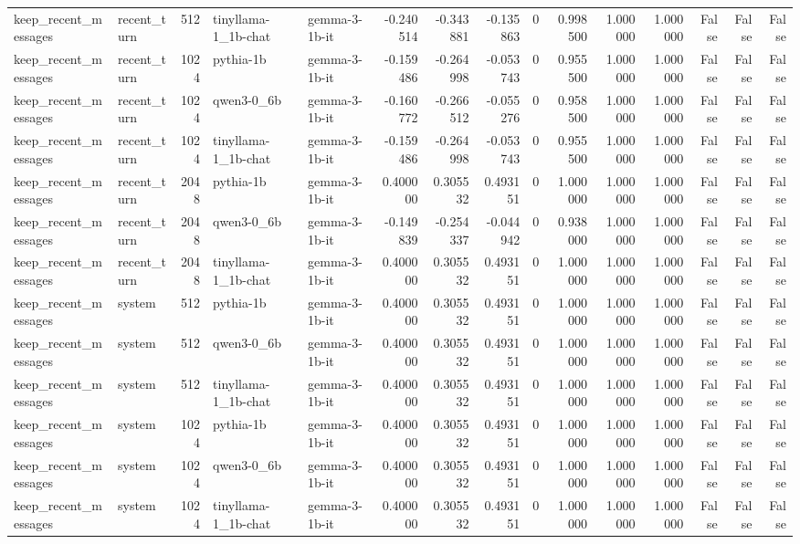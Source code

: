 \begin{tabular}{llrllrrrrrrrrrr}
keep_recent_messages & recent_turn & 512 & tinyllama-1_1b-chat & gemma-3-1b-it & -0.240514 & -0.343881 & -0.135863 & 0 & 0.998500 & 1.000000 & 1.000000 & False & False & False \\
keep_recent_messages & recent_turn & 1024 & pythia-1b & gemma-3-1b-it & -0.159486 & -0.264998 & -0.053743 & 0 & 0.955500 & 1.000000 & 1.000000 & False & False & False \\
keep_recent_messages & recent_turn & 1024 & qwen3-0_6b & gemma-3-1b-it & -0.160772 & -0.266512 & -0.055276 & 0 & 0.958500 & 1.000000 & 1.000000 & False & False & False \\
keep_recent_messages & recent_turn & 1024 & tinyllama-1_1b-chat & gemma-3-1b-it & -0.159486 & -0.264998 & -0.053743 & 0 & 0.955500 & 1.000000 & 1.000000 & False & False & False \\
keep_recent_messages & recent_turn & 2048 & pythia-1b & gemma-3-1b-it & 0.400000 & 0.305532 & 0.493151 & 0 & 1.000000 & 1.000000 & 1.000000 & False & False & False \\
keep_recent_messages & recent_turn & 2048 & qwen3-0_6b & gemma-3-1b-it & -0.149839 & -0.254337 & -0.044942 & 0 & 0.938000 & 1.000000 & 1.000000 & False & False & False \\
keep_recent_messages & recent_turn & 2048 & tinyllama-1_1b-chat & gemma-3-1b-it & 0.400000 & 0.305532 & 0.493151 & 0 & 1.000000 & 1.000000 & 1.000000 & False & False & False \\
keep_recent_messages & system & 512 & pythia-1b & gemma-3-1b-it & 0.400000 & 0.305532 & 0.493151 & 0 & 1.000000 & 1.000000 & 1.000000 & False & False & False \\
keep_recent_messages & system & 512 & qwen3-0_6b & gemma-3-1b-it & 0.400000 & 0.305532 & 0.493151 & 0 & 1.000000 & 1.000000 & 1.000000 & False & False & False \\
keep_recent_messages & system & 512 & tinyllama-1_1b-chat & gemma-3-1b-it & 0.400000 & 0.305532 & 0.493151 & 0 & 1.000000 & 1.000000 & 1.000000 & False & False & False \\
keep_recent_messages & system & 1024 & pythia-1b & gemma-3-1b-it & 0.400000 & 0.305532 & 0.493151 & 0 & 1.000000 & 1.000000 & 1.000000 & False & False & False \\
keep_recent_messages & system & 1024 & qwen3-0_6b & gemma-3-1b-it & 0.400000 & 0.305532 & 0.493151 & 0 & 1.000000 & 1.000000 & 1.000000 & False & False & False \\
keep_recent_messages & system & 1024 & tinyllama-1_1b-chat & gemma-3-1b-it & 0.400000 & 0.305532 & 0.493151 & 0 & 1.000000 & 1.000000 & 1.000000 & False & False & False \\

\end{tabular}
